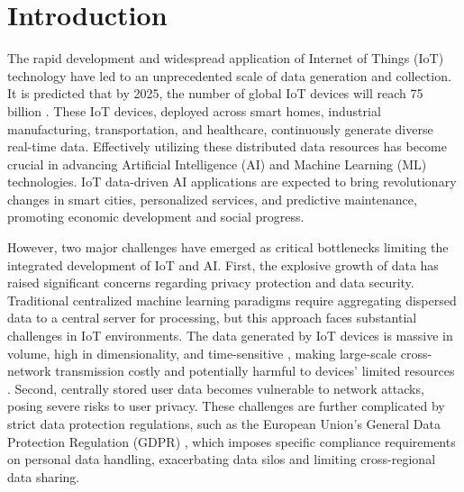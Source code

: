 \documentclass[a4paper]{cas-dc}
\begin{document}
		\maketitle
		

\section{Introduction}
The rapid development and widespread application of Internet of Things (IoT) technology have led to an unprecedented scale of data generation and collection. It is predicted that by 2025, the number of global IoT devices will reach 75 billion \cite{1}. These IoT devices, deployed across smart homes, industrial manufacturing, transportation, and healthcare, continuously generate diverse real-time data\cite{18}. Effectively utilizing these distributed data resources has become crucial in advancing Artificial Intelligence (AI) and Machine Learning (ML) technologies. IoT data-driven AI applications are expected to bring revolutionary changes in smart cities, personalized services, and predictive maintenance, promoting economic development and social progress\cite{3,4,5}.

However, two major challenges have emerged as critical bottlenecks limiting the integrated development of IoT and AI. First, the explosive growth of data has raised significant concerns regarding privacy protection and data security. Traditional centralized machine learning paradigms require aggregating dispersed data to a central server for processing, but this approach faces substantial challenges in IoT environments. The data generated by IoT devices is massive in volume, high in dimensionality, and time-sensitive \cite{6}, making large-scale cross-network transmission costly and potentially harmful to devices' limited resources \cite{9}. Second, centrally stored user data becomes vulnerable to network attacks, posing severe risks to user privacy\cite{7}. These challenges are further complicated by strict data protection regulations, such as the European Union's General Data Protection Regulation (GDPR) \cite{8}, which imposes specific compliance requirements on personal data handling, exacerbating data silos and limiting cross-regional data sharing.
\end{document}
